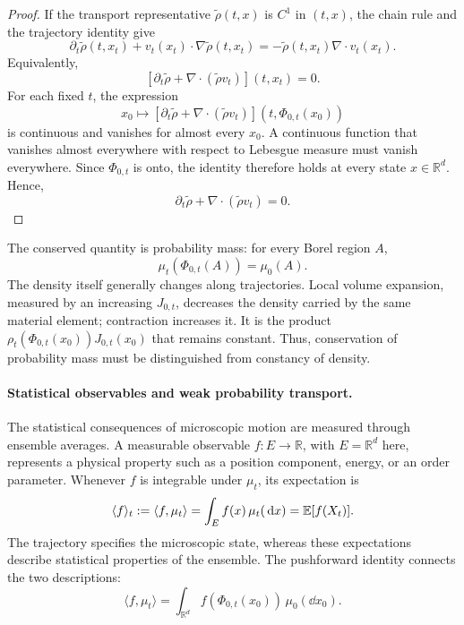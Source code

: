 \documentclass[12pt,a4paper,oneside]{book}
\begin{document}
\begin{proof}
If the transport representative $\widetilde\rho(t,x)$ is $C^1$ in $(t,x)$, the chain rule and the trajectory identity give
\begin{equation*}
    \partial_t\widetilde\rho(t,x_t) + v_t(x_t)\cdot\nabla\widetilde\rho(t,x_t) = -\widetilde\rho(t,x_t)\nabla\cdot v_t(x_t).
\end{equation*}
Equivalently,
\begin{equation*}
    \left[
        \partial_t\widetilde\rho + \nabla\cdot(\widetilde\rho v_t)
    \right](t,x_t)=0.
\end{equation*}
For each fixed $t$, the expression
\begin{equation*}
    x_0\mapsto
    \left[
        \partial_t\widetilde\rho + \nabla\cdot(\widetilde\rho v_t)
    \right](t,\Phi_{0,t}(x_0))
\end{equation*}
is continuous and vanishes for almost every $x_0$. A continuous function that vanishes almost everywhere with respect to 
Lebesgue measure must vanish everywhere. Since $\Phi_{0,t}$ is onto, the identity therefore holds at every state $x\in\mathbb R^d$. 
Hence,
\begin{equation*}
    \partial_t\widetilde\rho + \nabla\cdot(\widetilde\rho v_t)=0.
\end{equation*}
\end{proof}

\begin{Notice}
The conserved quantity is probability mass: for every Borel region $A$,
\begin{equation*}
    \mu_t(\Phi_{0,t}(A))=\mu_0(A).
\end{equation*}
The density itself generally changes along trajectories. Local volume expansion, measured by an increasing
$J_{0,t}$, decreases the density carried by the same material element; contraction increases it.
It is the product $\rho_t(\Phi_{0,t}(x_0))J_{0,t}(x_0)$ that remains constant.
Thus, conservation of probability mass must be distinguished from constancy of density.
\end{Notice}

\paragraph{Statistical observables and weak probability transport.}

The statistical consequences of microscopic motion are measured through ensemble averages. A measurable observable 
$f:E\to\mathbb R$, with $E=\mathbb R^d$ here, represents a physical property such as a position component, energy, or an 
order parameter. Whenever $f$ is integrable under $\mu_t$, its expectation is
\begin{equation*}
    \langle f\rangle_t :=\langle f,\mu_t\rangle = \int_E f(x)\,\mu_t(\,\mathrm{d} x) = \mathbb{E}[f(X_t)].
\end{equation*}
The trajectory specifies the microscopic state, whereas these expectations describe statistical properties of the ensemble.
The pushforward identity connects the two descriptions:
\begin{equation*}
    \langle f,\mu_t\rangle = \int_{\mathbb R^d}f(\Phi_{0,t}(x_0))\,\mu_0(\dd x_0).
\end{equation*}
\end{document}
